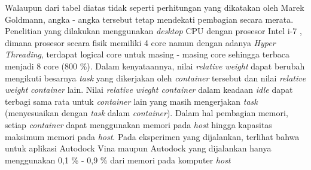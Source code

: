 Walaupun dari tabel diatas tidak seperti perhitungan yang dikatakan oleh Marek Goldmann, angka - angka tersebut tetap mendekati pembagian secara merata. Penelitian yang dilakukan menggunakan \textit{desktop} CPU dengan  prosesor Intel i-7 , dimana prosesor secara fisik memiliki 4 core namun dengan adanya \textit{Hyper Threading}, terdapat logical core untuk masing - masing core sehingga terbaca menjadi 8 core (800 \%). Dalam kenyataannya, nilai \textit{relative weight} dapat berubah mengikuti besarnya \textit{task} yang dikerjakan oleh \textit{container} tersebut dan nilai \textit{relative weight} \textit{container} lain. Nilai \textit{relative wieght container} dalam keadaan \textit{idle} dapat terbagi sama rata untuk \textit{container} lain yang masih mengerjakan \textit{task} (menyesuaikan dengan \textit{task} dalam \textit{container}). Dalam hal pembagian memori, setiap \textit{container} dapat menggunakan memori pada \textit{host} hingga kapasitas maksimum memori pada \textit{host}. Pada eksperimen yang dijalankan, terlihat bahwa untuk aplikasi Autodock Vina maupun Autodock yang dijalankan hanya menggunakan 0,1 \% - 0,9 \% dari memori pada komputer \textit{host}

